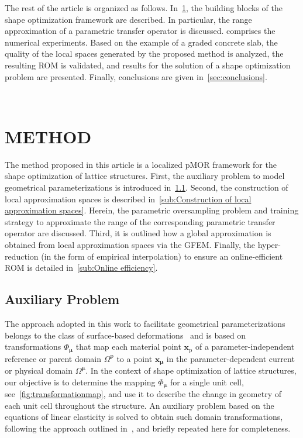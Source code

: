 \documentclass[a4paper]{eccomas_paper-2024}
\begin{document}
The rest of the article is organized as follows.
In~\cref{sec:method}, the building blocks of the shape optimization framework are described.
In particular, the range approximation of a parametric transfer operator is discussed.
 comprises the numerical experiments.
Based on the example of a graded concrete slab, the quality of the local spaces generated by the proposed method is analyzed, the resulting ROM is validated, and results for the solution of a shape optimization problem are presented.
Finally, conclusions are given in~\cref{sec:conclusions}.

\\

\section{METHOD}%
\label{sec:method}
The method proposed in this article is a localized pMOR framework for the shape optimization of lattice structures.
First, the auxiliary problem to model geometrical parameterizations is introduced in~\cref{sub:Auxiliary Problem}.
Second, the construction of local approximation spaces is described in~\cref{sub:Construction of local approximation spaces}.
Herein, the parametric oversampling problem and training strategy to approximate the range of the corresponding parametric transfer operator are discussed.
Third, it is outlined how a global approximation is obtained from local approximation spaces via the GFEM.
Finally, the hyper-reduction (in the form of empirical interpolation) to ensure an online-efficient ROM is detailed in~\cref{sub:Online efficiency}.

\subsection{Auxiliary Problem} %
\label{sub:Auxiliary Problem}
The approach adopted in this work to facilitate geometrical parameterizations belongs to the class of surface-based deformations~\cite{Botsch2010Polygon} and is based on transformations $\Phi_{\bm\mu}$ that map each material point $\bm{x}_{\mathrm{p}}$ of a parameter-independent reference or parent domain $\varOmega^{\mathrm{p}}$ to a point $\bm{x}_{\bm\mu}$ in the parameter-dependent current or physical domain $\varOmega^{\bm\mu}$.
In the context of shape optimization of lattice structures, our objective is to determine the mapping $\Phi_{\bm\mu}$ for a single unit cell, see~\cref{fig:transformationmap}, and use it to describe the change in geometry of each unit cell throughout the structure.
An auxiliary problem based on the equations of linear elasticity is solved to obtain such domain transformations, following the approach outlined in~\cite{Guo2022Learning}, and briefly repeated here for completeness.
\end{document}
